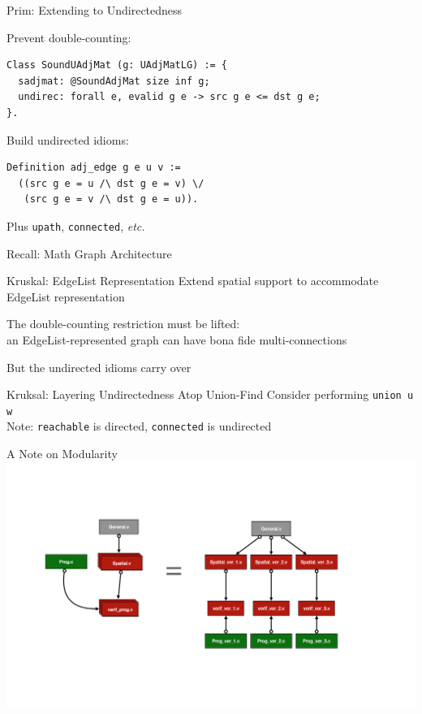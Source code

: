 \documentclass[usenames, xcolor=dvipsnames]{beamer}
\begin{document}
\begin{frame}[fragile]{Prim: Extending to Undirectedness}

Prevent double-counting:
\begin{Verbatim}
Class SoundUAdjMat (g: UAdjMatLG) := {
  sadjmat: @SoundAdjMat size inf g;
  undirec: forall e, evalid g e -> src g e <= dst g e;
}.
\end{Verbatim}

\pause \bigskip
Build undirected idioms:
\begin{Verbatim}
Definition adj_edge g e u v :=
  ((src g e = u /\ dst g e = v) \/ 
   (src g e = v /\ dst g e = u)).
\end{Verbatim}
Plus \texttt{upath}, \texttt{connected}, \emph{etc.}
\end{frame}

\begin{frame}{Recall: Math Graph Architecture}
  \centering
  \colorbox{lightg}{}
\end{frame}

\begin{frame}{Kruskal: EdgeList Representation}
Extend spatial support to accommodate EdgeList representation

\bigskip

The double-counting restriction must be lifted: \\
\hspace{1em}an EdgeList-represented graph can have bona fide multi-connections

\bigskip

But the undirected idioms carry over
\end{frame}

\begin{frame}{Kruksal: Layering Undirectedness Atop Union-Find}
  Consider performing \texttt{union u w} \\
  Note: \texttt{reachable} is directed, \texttt{connected} is undirected \\
  \vspace{2em}
  \centering
  
\end{frame}

\begin{frame}{A Note on Modularity}
\centering
  \includegraphics[scale=0.33]{key}
\end{frame}
\end{document}
